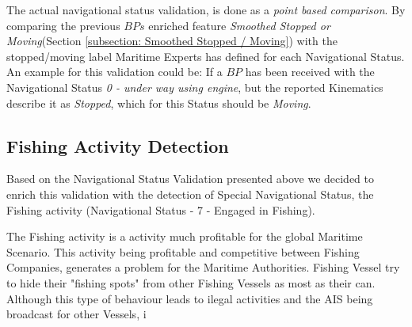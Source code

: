The actual navigational status validation, is done as a \emph{point based comparison}. By comparing the previous $BPs$ enriched feature \emph{Smoothed Stopped or Moving}(Section \ref{subsection: Smoothed Stopped / Moving}) with the stopped/moving label Maritime Experts has defined for each Navigational Status.
An example for this validation could be:
If a $BP$ has been received with the Navigational Status \textit{0 - under way using engine}, but the reported Kinematics describe it as \textit{Stopped}, which for this Status should be \textit{Moving}.

\subsection{Fishing Activity Detection}
\label{subsection: Fishing Activity Detection}

Based on the Navigational Status Validation presented above we decided to enrich this validation with the detection of Special Navigational Status, the Fishing activity (Navigational Status - 7 - Engaged in Fishing). 

The Fishing activity is a activity much profitable for the global Maritime Scenario. This activity being profitable and competitive between Fishing Companies, generates a problem for the Maritime Authorities. Fishing Vessel try to hide their "fishing spots" from other Fishing Vessels as most as their can. Although this type of behaviour leads to ilegal activities   and the AIS being broadcast for other Vessels, i


